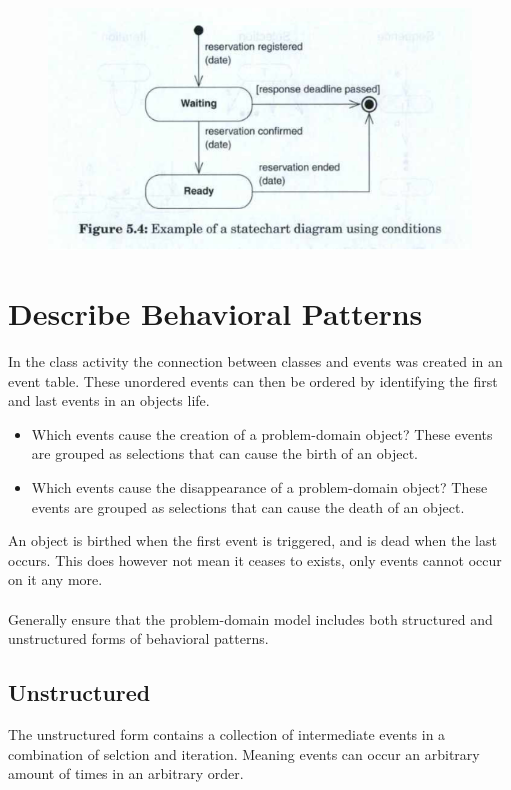 \begin{figure}[H]
    \centering
    \includegraphics[width=\linewidth]{parts/2_problem_domain_analysis/behavior/figures/condtion_statechart.png}
\end{figure}

\section{Describe Behavioral Patterns \ooad[98]}
In the class activity the connection between classes and events was created in an event table. These unordered events can then be ordered by identifying the first and last events in an objects life.
\begin{itemize}
    \item Which events cause the creation of a problem-domain object? These events are grouped as selections that can cause the birth of an object.
    \item Which events cause the disappearance of a problem-domain object? These events are grouped as selections that can cause the death of an object.
\end{itemize}
An object is birthed when the first event is triggered, and is dead when the last occurs. This does however not mean it ceases to exists, only events cannot occur on it any more.
\\\\
Generally ensure that the problem-domain model includes both structured and unstructured forms of behavioral patterns.

\subsection*{Unstructured}
The unstructured form contains a collection of intermediate events in a combination of selction and iteration. Meaning events can occur an arbitrary amount of times in an arbitrary order.

